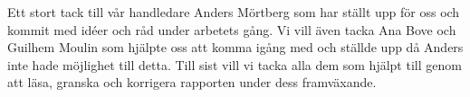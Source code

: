 Ett stort tack till vår handledare Anders Mörtberg som har ställt upp för oss
och kommit med idéer och råd under arbetets gång.
Vi vill även tacka Ana Bove och Guilhem Moulin
som hjälpte oss att komma igång med \coq{} och ställde upp då Anders inte hade
möjlighet till detta.
Till sist vill vi tacka alla dem som hjälpt till genom att läsa, granska och
korrigera rapporten under dess framväxande.
